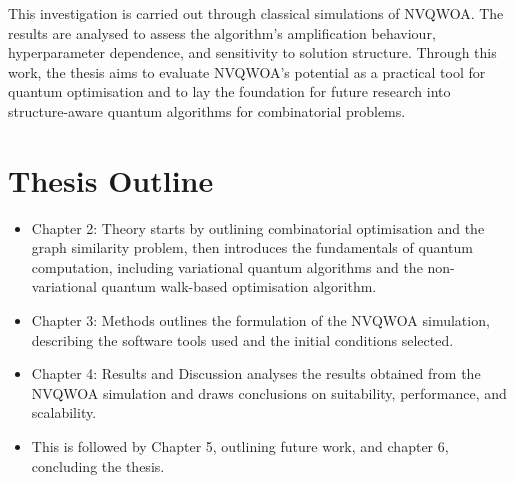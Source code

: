 This investigation is carried out through classical simulations of NVQWOA. The results are analysed to assess the algorithm's amplification behaviour, hyperparameter dependence, and sensitivity to solution structure. Through this work, the thesis aims to evaluate NVQWOA's potential as a practical tool for quantum optimisation and to lay the foundation for future research into structure-aware quantum algorithms for combinatorial problems.

\section{Thesis Outline}
\begin{itemize}
    \item Chapter 2: Theory starts by outlining combinatorial optimisation and the graph similarity problem, then introduces the fundamentals of quantum computation, including variational quantum algorithms and the non-variational quantum walk-based optimisation algorithm.
    \item Chapter 3: Methods outlines the formulation of the NVQWOA simulation, describing the software tools used and the initial conditions selected.
    \item Chapter 4: Results and Discussion analyses the results obtained from the NVQWOA simulation and draws conclusions on suitability, performance, and scalability.
    \item This is followed by Chapter 5, outlining future work, and chapter 6, concluding the thesis.
\end{itemize}
